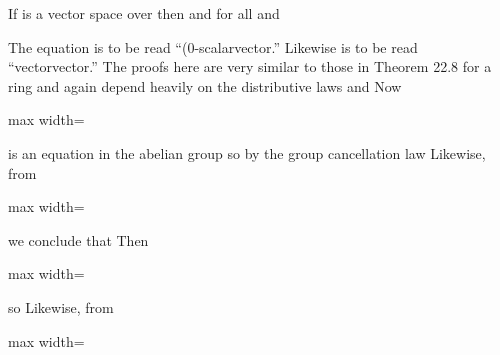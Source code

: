 \documentclass[11pt,oneside]{article}
\begin{document}
\begin{BookBody}

 If  is a vector space over  then  and  for all  and 

 The equation  is to be read “(0-scalarvector.” Likewise is to be read “vectorvector.” The proofs here are very similar to those in Theorem 22.8 for a ring and again depend heavily on the distributive laws  and  Now

\begin{center}\begin{adjustbox}{max width=\linewidth}\end{adjustbox}\end{center}

\noindent is an equation in the abelian group  so by the group cancellation law Likewise, from

\begin{center}\begin{adjustbox}{max width=\linewidth}\end{adjustbox}\end{center}

\noindent we conclude that  Then

\begin{center}\begin{adjustbox}{max width=\linewidth}\end{adjustbox}\end{center}

\noindent so  Likewise, from

\begin{center}\begin{adjustbox}{max width=\linewidth}\end{adjustbox}\end{center}


\end{BookBody}
\end{document}
